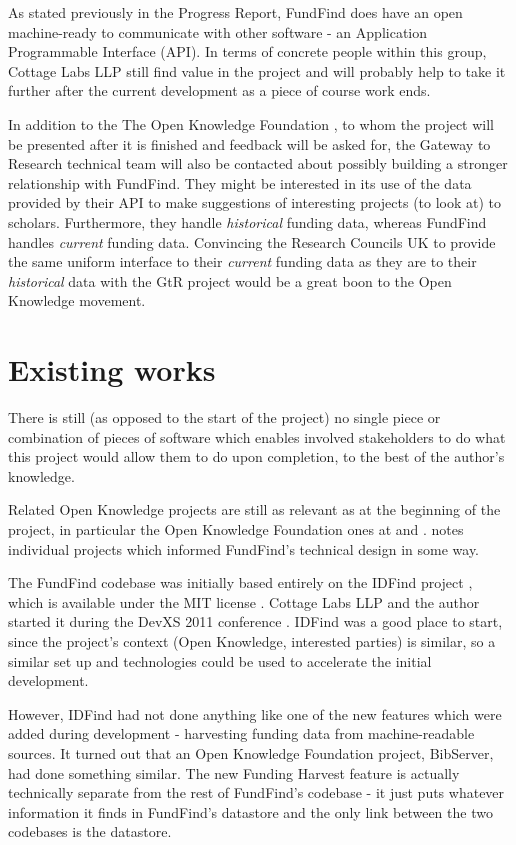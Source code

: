 As stated previously in the Progress Report, FundFind does have an open machine-ready to communicate with other software - an Application Programmable Interface (API). In terms of concrete people within this group, Cottage Labs LLP \cite{cl} still find value in the project and will probably help to take it further after the current development as a piece of course work ends.

In addition to the The Open Knowledge Foundation \cite{okfn-vision}, to whom the project will be presented after it is finished and feedback will be asked for, the Gateway to Research technical team will also be contacted about possibly building a stronger relationship with FundFind. They might be interested in its use of the data provided by their API to make suggestions of interesting projects (to look at) to scholars. Furthermore, they handle \emph{historical} funding data, whereas FundFind handles \emph{current} funding data. Convincing the Research Councils UK to provide the same uniform interface to their \emph{current} funding data as they are to their \emph{historical} data with the GtR project would be a great boon to the Open Knowledge movement.

\section{Existing works}
\label{existing-works}
There is still (as opposed to the start of the project) no single piece or combination of pieces of software which enables involved stakeholders to do what this project would allow them to do upon completion, to the best of the author's knowledge.

Related Open Knowledge projects are still as relevant as at the beginning of the project, in particular the Open Knowledge Foundation ones at \cite{okfn-labs} and \cite{okfn-github}.  notes individual projects which informed FundFind's technical design in some way.

The FundFind codebase was initially based entirely on the IDFind project \cite{idfind}, which is available under the MIT license \cite{idfind-src}. Cottage Labs LLP and the author started it during the DevXS 2011 conference \cite{devxs}. IDFind was a good place to start, since the project's context (Open Knowledge, interested parties) is similar, so a similar set up and technologies could be used to accelerate the initial development.

However, IDFind had not done anything like one of the new features which were added during development - harvesting funding data from machine-readable sources. It turned out that an Open Knowledge Foundation project, BibServer, had done something similar. The new Funding Harvest feature is actually technically separate from the rest of FundFind's codebase - it just puts whatever information it finds in FundFind's datastore and the only link between the two codebases is the datastore.

